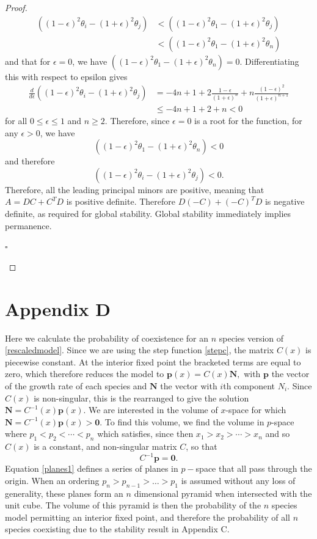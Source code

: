 \begin{proof}
\begin{align*}
\left( (1-\epsilon)^2\theta_i-(1+\epsilon)^2\theta_j\right)&<\left( (1-\epsilon)^2\theta_1-(1+\epsilon)^2\theta_j\right)\\
&<\left( (1-\epsilon)^2\theta_1-(1+\epsilon)^2\theta_n\right)
\end{align*}
and that for $\epsilon=0$, we have $\left( (1-\epsilon)^2\theta_1-(1+\epsilon)^2\theta_n\right)=0$. Differentiating this with respect to epsilon gives
\begin{align*}
\frac{d}{d\epsilon}\left( (1-\epsilon)^2\theta_i-(1+\epsilon)^2\theta_j\right)&=-4n+1+2\frac{1-\epsilon}{(1+\epsilon)^n}+n\frac{(1-\epsilon)^2}{(1+\epsilon)^{n+1}}\\
&\leq-4n +1+2+n < 0
\end{align*}
for all $0\leq \epsilon \leq 1$ and $n\geq2$. Therefore, since $\epsilon=0$ is a root for the function, for any $\epsilon>0$, we have
$$\left( (1-\epsilon)^2\theta_1-(1+\epsilon)^2\theta_n\right)<0$$
and therefore
$$\left( (1-\epsilon)^2\theta_i-(1+\epsilon)^2\theta_j\right)<0.$$
Therefore, all the leading principal minors are positive, meaning that $A=DC+C^TD$ is positive definite. Therefore $D(-C)+(-C)^TD$ is negative definite, as required for global stability. Global stability immediately implies permanence. \begin{flushright} $\square$ \end{flushright}
 \end{proof}
 
 \section*{Appendix D}
Here we calculate the probability of coexistence for an $n$ species version of \eqref{rescaledmodel}. Since we are using the step function \eqref{stepc}, the matrix $C(x)$ is piecewise constant. At the interior fixed point the bracketed terms are equal to zero, which therefore reduces the model to
$
\mathbf{p}(x)=C(x)\mathbf{N},
$
with $\mathbf{p}$ the vector of the growth rate of each species and $\mathbf{N}$ the vector with $i$th component $N_i$. Since $C(x)$ is non-singular, this is the rearranged to give the solution 
$
\mathbf{N}=C^{-1}(x)\textbf{p}(x)$. 
We are interested in the volume of $x$-space for which $\mathbf{N}=C^{-1}(x)\mathbf{p}(x)> \mathbf{0}$. To find this volume, we find the volume in $p$-space where $p_1 < p_2 <\cdots < p_n$ which satisfies, since then $x_1>x_2> \cdots > x_n$ and so $C(x)$ is a constant, and non-singular matrix $C$, so that
\begin{equation}
C^{-1}\mathbf{p} = \mathbf{0}. \label{planes1}
\end{equation}
Equation \eqref{planes1} defines a series of planes in $p-$space that all pass through the origin. When an ordering $p_n>p_{n-1}>\dots>p_1$ is assumed without any loss of generality, these planes form an $n$ dimensional pyramid when intersected with the unit cube. The volume of this pyramid is then the probability of the $n$ species model permitting an interior fixed point, and therefore the probability of all $n$ species coexisting due to the stability result in Appendix C.

